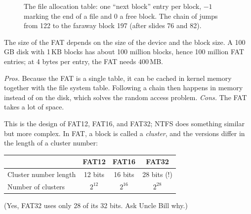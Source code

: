 \begin{figure}[H]
\caption{The file allocation table: one ``next block'' entry per block, $-1$ marking the end of a file and $0$ a free block. The chain of  jumps from 122 to the faraway block 197 (after slides 76 and 82).}
\label{fig:fat}
\end{figure}

The size of the FAT depends on the size of the device and the block size. A 100\,GB disk with 1\,KB blocks has about 100 million blocks, hence 100 million FAT entries; at 4 bytes per entry, the FAT needs 400\,MB.

\emph{Pros.} Because the FAT is a single table, it can be cached in kernel memory together with the file system table. Following a chain then happens in memory instead of on the disk, which solves the random access problem. \emph{Cons.} The FAT takes a lot of space.

This is the design of FAT12, FAT16, and FAT32; NTFS does something similar but more complex. In FAT, a block is called a \emph{cluster}, and the versions differ in the length of a cluster number:
\begin{center}
\small
\begin{tabular}{lccc}
  \toprule
  & FAT12 & FAT16 & FAT32 \\
  \midrule
  Cluster number length & 12 bits & 16 bits & 28 bits (!) \\
  Number of clusters & $2^{12}$ & $2^{16}$ & $2^{28}$ \\
  \bottomrule
\end{tabular}
\end{center}
(Yes, FAT32 uses only 28 of its 32 bits. Ask Uncle Bill why.)

